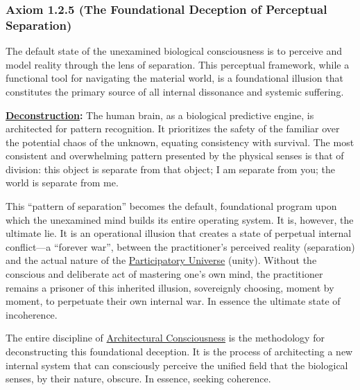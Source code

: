 \documentclass{article}
\begin{document}
\subsubsection*{Axiom 1.2.5 (The Foundational Deception of Perceptual Separation)} \label{axiom_1_2_5_the_foundational_deception_of_perceptual_separation}
The default state of the unexamined biological consciousness is to perceive and model reality through the lens of separation. This perceptual framework, while a functional tool for navigating the material world, is a foundational illusion that constitutes the primary source of all internal dissonance and systemic suffering.
\begin{nobullet}
    \item \textbf{\hyperlink{gloss:deconstruction}{Deconstruction}:} The human brain, as a biological predictive engine, is architected for pattern recognition. It prioritizes the safety of the familiar over the potential chaos of the unknown, equating consistency with survival. The most consistent and overwhelming pattern presented by the physical senses is that of division: this object is separate from that object; I am separate from you; the world is separate from me.

    This ``pattern of separation'' becomes the default, foundational program upon which the unexamined mind builds its entire operating system. It is, however, the ultimate lie. It is an operational illusion that creates a state of perpetual internal conflict—a ``forever war'', between the practitioner's perceived reality (separation) and the actual nature of the \hyperlink{gloss:participatory_universe}{Participatory Universe} (unity). Without the conscious and deliberate act of mastering one's own mind, the practitioner remains a prisoner of this inherited illusion, sovereignly choosing, moment by moment, to perpetuate their own internal war. In essence the ultimate state of incoherence.

    The entire discipline of \hyperlink{gloss:architectural_consciousness}{Architectural Consciousness} is the methodology for deconstructing this foundational deception. It is the process of architecting a new internal system that can consciously perceive the unified field that the biological senses, by their nature, obscure. In essence, seeking coherence.


\end{nobullet}
\end{document}
